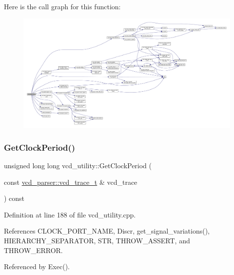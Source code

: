 Here is the call graph for this function\+:
\nopagebreak
\begin{figure}[H]
\begin{center}
\leavevmode
\includegraphics[width=350pt]{d8/d51/classvcd__utility_ad6098cc9cf2ed44a6ae34f9b896760dd_cgraph}
\end{center}
\end{figure}
\mbox{\label{classvcd__utility_a8860891d7d9c6188515feb8ab0bddcf0}} 
\subsubsection{\texorpdfstring{Get\+Clock\+Period()}{GetClockPeriod()}}
{\footnotesize\ttfamily unsigned long long vcd\+\_\+utility\+::\+Get\+Clock\+Period (\begin{DoxyParamCaption}\item[{const \hyperlink{classvcd__parser_a84b85cb9df5165fca362a9da87c5a02f}{vcd\+\_\+parser\+::vcd\+\_\+trace\+\_\+t} \&}]{vcd\+\_\+trace }\end{DoxyParamCaption}) const\hspace{0.3cm}{\ttfamily [protected]}}



Definition at line 188 of file vcd\+\_\+utility.\+cpp.



References C\+L\+O\+C\+K\+\_\+\+P\+O\+R\+T\+\_\+\+N\+A\+ME, Discr, get\+\_\+signal\+\_\+variations(), H\+I\+E\+R\+A\+R\+C\+H\+Y\+\_\+\+S\+E\+P\+A\+R\+A\+T\+OR, S\+TR, T\+H\+R\+O\+W\+\_\+\+A\+S\+S\+E\+RT, and T\+H\+R\+O\+W\+\_\+\+E\+R\+R\+OR.



Referenced by Exec().

